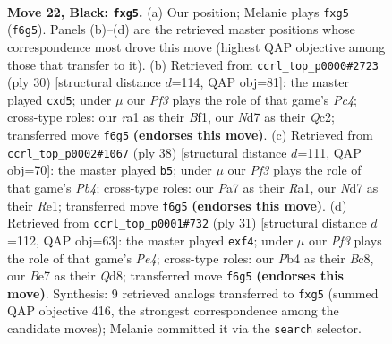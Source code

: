 \documentclass[11pt]{article}
\begin{document}
\clearpage

\begin{figure}[p]\centering
\begin{subfigure}{0.46\textwidth}\centering
\resizebox{\linewidth}{!}{%
\newchessgame
\chessboard[
  setfen={r1b1r1k1/p2nb2p/2p2p2/3q2P1/Pp1p1P2/1P1Q2P1/3NPK2/RNB2R2 b - - 0 22},
  showmover=false,
  pgfstyle=straightmove, color=movearrow, markmove={f6-g5}
]}
\caption{}
\end{subfigure}\hfill
\begin{subfigure}{0.46\textwidth}\centering
\resizebox{\linewidth}{!}{%
\newchessgame
\chessboard[
  setfen={r1r3k1/pb1nqpp1/1p2pn1p/3p4/2PR3B/P1N1PP2/1PQ3PP/4KB1R w K - 0 16},
  showmover=false,
  pgfstyle=straightmove, color=movearrow, markmove={c4-d5}
]}
\caption{}
\end{subfigure}
\\[4pt]
\begin{subfigure}{0.46\textwidth}\centering
\resizebox{\linewidth}{!}{%
\newchessgame
\chessboard[
  setfen={r3r1k1/1p1nqpbp/2pp1np1/p7/1PPNP3/4B1PP/P1Q2PB1/R3R1K1 w - - 2 20},
  showmover=false,
  pgfstyle=straightmove, color=movearrow, markmove={b4-b5}
]}
\caption{}
\end{subfigure}\hfill
\begin{subfigure}{0.46\textwidth}\centering
\resizebox{\linewidth}{!}{%
\newchessgame
\chessboard[
  setfen={r1bqnrk1/pp2b1p1/3p3p/3Pp3/P3NP2/2NQB2P/1P4P1/R4RK1 b - - 0 16},
  showmover=false,
  pgfstyle=straightmove, color=movearrow, markmove={e5-f4}
]}
\caption{}
\end{subfigure}
\caption{\textbf{Move 22, Black: \texttt{fxg5}.} (a) Our position; Melanie plays \texttt{fxg5} (\texttt{f6g5}). Panels (b)--(d) are the retrieved master positions whose correspondence most drove this move (highest QAP objective among those that transfer to it). (b) Retrieved from \texttt{ccrl\_top\_p0000\#2723} (ply 30) [structural distance $d$=114, QAP obj=81]: the master played \texttt{cxd5}; under $\mu$ our \emph{Pf3} plays the role of that game's \emph{Pc4}; cross-type roles: our \emph{r}a1 as their \emph{B}f1, our \emph{N}d7 as their \emph{Q}c2; transferred move \texttt{f6g5} \textbf{(endorses this move)}. (c) Retrieved from \texttt{ccrl\_top\_p0002\#1067} (ply 38) [structural distance $d$=111, QAP obj=70]: the master played \texttt{b5}; under $\mu$ our \emph{Pf3} plays the role of that game's \emph{Pb4}; cross-type roles: our \emph{P}a7 as their \emph{R}a1, our \emph{N}d7 as their \emph{R}e1; transferred move \texttt{f6g5} \textbf{(endorses this move)}. (d) Retrieved from \texttt{ccrl\_top\_p0001\#732} (ply 31) [structural distance $d$=112, QAP obj=63]: the master played \texttt{exf4}; under $\mu$ our \emph{Pf3} plays the role of that game's \emph{Pe4}; cross-type roles: our \emph{P}b4 as their \emph{B}c8, our \emph{B}e7 as their \emph{Q}d8; transferred move \texttt{f6g5} \textbf{(endorses this move)}. Synthesis: 9 retrieved analogs transferred to \texttt{fxg5} (summed QAP objective 416, the strongest correspondence among the candidate moves); Melanie committed it via the \texttt{search} selector.}
\label{fig:thought-m43}
\end{figure}
\end{document}
